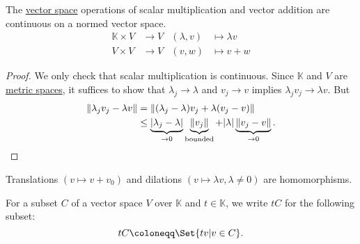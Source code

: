 \documentclass{article}
\newcommand{\K}{\mathbb{K}}
\begin{document}
\begin{fact}
    The \hyperlink{def:nvs}{vector space} operations of scalar multiplication and vector addition are continuous on a normed vector space.
    \begin{align*}
        \K \times V &\to V & (\lambda, v) &\mapsto \lambda v \\
        V \times V &\to V & (v, w) &\mapsto v + w
    \end{align*}
\end{fact}

\begin{proof}
    We only check that scalar multiplication is continuous. Since $\K$ and $V$ are \hyperlink{def:metricOnVS}{metric spaces}, it suffices to show that $\lambda_j \to \lambda$ and $v_j \to v$ implies $\lambda_j v_j \to \lambda v$. But
    \begin{align*}
        \|\lambda_j v_j - \lambda v\| &= \|(\lambda_j - \lambda) v_j + \lambda(v_j - v)\| \\
                                      &\leq \underbrace{|\lambda_j - \lambda|}_{\to 0} \underbrace{\|v_j\|}_\text{bounded} + |\lambda| \underbrace{\|v_j - v\|}_{\to 0}. \qedhere
    \end{align*}
\end{proof}

\begin{cor}
    Translations $(v \mapsto v + v_0)$ and dilations $(v \mapsto \lambda v, \lambda \ne 0)$ are homomorphisms.
\end{cor}


\begin{notation}
    For a subset $C$ of a vector space $V$ over $\K$ and $t \in \K$, we write $t C$ for the following subset:
    \begin{equation*}
        t C \coloneqq \Set{t v | v \in C}.
    \end{equation*}
\end{notation}

\end{document}
